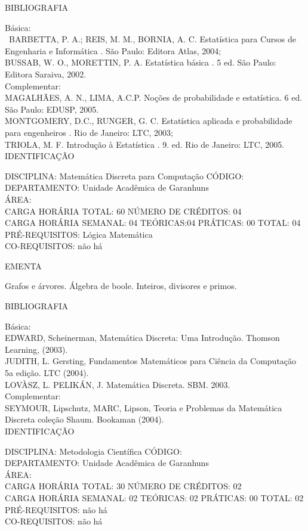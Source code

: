 \documentclass[
	12pt,				%
	openright,			%
  oneside,     %
	a4paper,			%
	english,			%
	french,				%
	spanish,			%
	brazil				%
	]{abntex2}
\begin{document}
\begin{apendicesenv}
BIBLIOGRAFIA 

Básica:\\\
BARBETTA, P. A.; REIS, M. M., BORNIA, A. C. Estatística para Cursos de Engenharia e Informática . São Paulo: Editora Atlas, 2004;\\
BUSSAB, W. O., MORETTIN, P. A. Estatística básica . 5 ed. São Paulo: Editora Saraiva, 2002.\\
Complementar:\\
MAGALHÃES, A. N., LIMA, A.C.P.  Noções de probabilidade e estatística. 6 ed. São Paulo: EDUSP, 2005.\\
MONTGOMERY, D.C., RUNGER, G. C. Estatística aplicada e probabilidade para engenheiros . Rio de Janeiro: LTC, 2003;\\
TRIOLA, M. F.  Introdução à Estatística . 9. ed. Rio de Janeiro: LTC, 2005.\\

\newpage IDENTIFICAÇÃO

DISCIPLINA: Matemática Discreta para Computação CÓDIGO:\\
DEPARTAMENTO: Unidade Acadêmica de Garanhuns\\
ÁREA: \\
CARGA HORÁRIA TOTAL: 60 NÚMERO DE CRÉDITOS: 04\\
CARGA HORÁRIA SEMANAL: 04 TEÓRICAS:04 PRÁTICAS: 00 TOTAL: 04\\
PRÉ-REQUISITOS: Lógica Matemática\\
CO-REQUISITOS: não há

EMENTA 

Grafos e árvores. Álgebra de boole. Inteiros, divisores e primos.

BIBLIOGRAFIA 

Básica:\\
EDWARD, Scheinerman, Matemática Discreta: Uma Introdução. Thomson
Learning, (2003).\\
JUDITH, L. Gersting, Fundamentos Matemáticos para Ciência da Computação
 5a edição. LTC (2004).\\
LOVÀSZ, L. PELIKÁN, J. Matemática Discreta. SBM. 2003.\\
Complementar:\\
SEYMOUR, Lipschutz, MARC, Lipson, Teoria e Problemas da Matemática
Discreta  coleção Shaum. Bookaman (2004).\\


\newpage IDENTIFICAÇÃO

DISCIPLINA: Metodologia Científica CÓDIGO:\\
DEPARTAMENTO: Unidade Acadêmica de Garanhuns\\
ÁREA: \\
CARGA HORÁRIA TOTAL: 30 NÚMERO DE CRÉDITOS: 02\\
CARGA HORÁRIA SEMANAL: 02 TEÓRICAS: 02 PRÁTICAS: 00 TOTAL: 02\\
PRÉ-REQUISITOS: não há\\
CO-REQUISITOS: não há


\end{apendicesenv}
\end{document}

